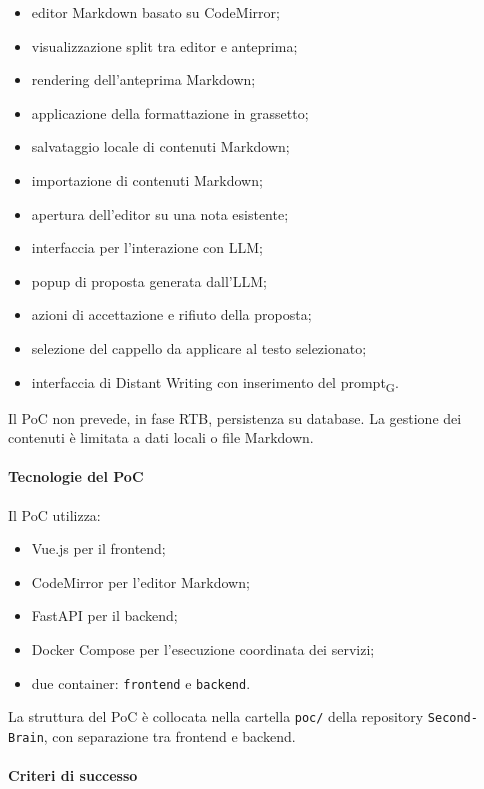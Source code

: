 \begin{itemize}
    \item editor Markdown basato su CodeMirror;
    \item visualizzazione split tra editor e anteprima;
    \item rendering dell'anteprima Markdown;
    \item applicazione della formattazione in grassetto;
    \item salvataggio locale di contenuti Markdown;
    \item importazione di contenuti Markdown;
    \item apertura dell'editor su una nota esistente;
    \item interfaccia per l'interazione con LLM;
    \item popup di proposta generata dall'LLM;
    \item azioni di accettazione e rifiuto della proposta;
    \item selezione del cappello da applicare al testo selezionato;
    \item interfaccia di Distant Writing con inserimento del prompt\textsubscript{G}.
\end{itemize}

Il PoC non prevede, in fase RTB, persistenza su database. La gestione dei
contenuti è limitata a dati locali o file Markdown.

\paragraph{Tecnologie del PoC}

Il PoC utilizza:

\begin{itemize}
    \item Vue.js per il frontend;
    \item CodeMirror per l'editor Markdown;
    \item FastAPI per il backend;
    \item Docker Compose per l'esecuzione coordinata dei servizi;
    \item due container: \texttt{frontend} e \texttt{backend}.
\end{itemize}

La struttura del PoC è collocata nella cartella \texttt{poc/} della repository
\texttt{Second-Brain}, con separazione tra frontend e backend.

\paragraph{Criteri di successo}

